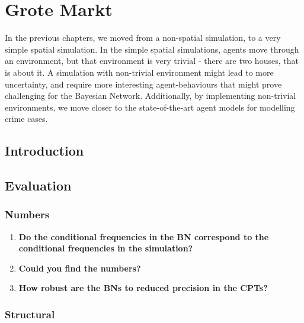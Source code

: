  

\chapter[Grote Markt]{Grote Markt}

In the previous chapters, we moved from a non-spatial simulation, to a very simple spatial simulation. In the simple spatial simulations, agents move through an environment, but that environment is very trivial - there are two houses, that is about it. A simulation with non-trivial environment might lead to more uncertainty, and require more interesting agent-behaviours that might prove challenging for the Bayesian Network. Additionally, by implementing non-trivial environments, we move closer to the state-of-the-art agent models for modelling crime cases.

\section{Introduction}


\section{Evaluation}



\subsection{Numbers}
\begin{enumerate}
\item \textbf{Do the conditional frequencies in the BN correspond to the conditional frequencies in the simulation?}
\item \textbf{Could you find the numbers?}
\item \textbf{How robust are the BNs to reduced precision in the CPTs?}
\end{enumerate}

\subsection{Structural}

